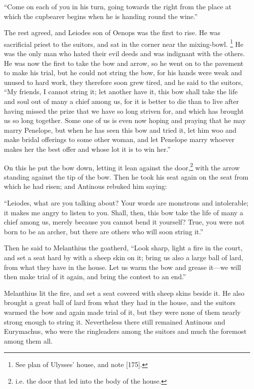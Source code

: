 “Come on each of you in his turn, going towards the right from the place at
which the cupbearer begins when he is handing round the wine.”

The rest agreed, and Leiodes son of Oenops was the first to rise. He was
sacrificial priest to the suitors, and sat in the corner near the mixing-bowl.
\footnote{See plan of Ulysses’ house, and note [175].} He was the
only man who hated their evil deeds and was indignant with the others. He was
now the first to take the bow and arrow, so he went on to the pavement to make
his trial, but he could not string the bow, for his hands were weak and unused
to hard work, they therefore soon grew tired, and he said to the suitors, “My
friends, I cannot string it; let another have it, this bow shall take the life
and soul out of many a chief among us, for it is better to die than to live
after having missed the prize that we have so long striven for, and which has
brought us so long together. Some one of us is even now hoping and praying that
he may marry Penelope, but when he has seen this bow and tried it, let him woo
and make bridal offerings to some other woman, and let Penelope marry whoever
makes her the best offer and whose lot it is to win her.”

On this he put the bow down, letting it lean against the door,\footnote{i.e. the door that led into the body of the house.} with the arrow
standing against the tip of the bow. Then he took his seat again on the seat
from which he had risen; and Antinous rebuked him saying:

“Leiodes, what are you talking about? Your words are monstrous and intolerable;
it makes me angry to listen to you. Shall, then, this bow take the life of many
a chief among us, merely because you cannot bend it yourself? True, you were
not born to be an archer, but there are others who will soon string it.”

Then he said to Melanthius the goatherd, “Look sharp, light a fire in the
court, and set a seat hard by with a sheep skin on it; bring us also a large
ball of lard, from what they have in the house. Let us warm the bow and grease
it—we will then make trial of it again, and bring the contest to an end.”

Melanthius lit the fire, and set a seat covered with sheep skins beside it. He
also brought a great ball of lard from what they had in the house, and the
suitors warmed the bow and again made trial of it, but they were none of them
nearly strong enough to string it. Nevertheless there still remained Antinous
and Eurymachus, who were the ringleaders among the suitors and much the
foremost among them all.


